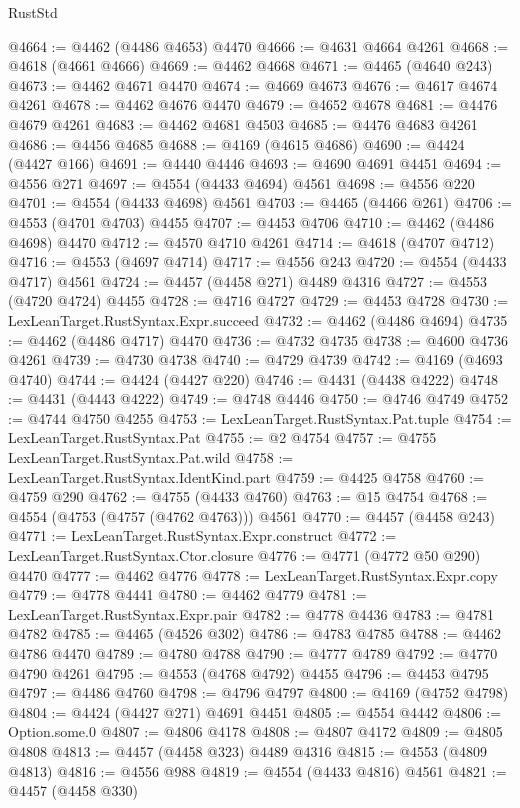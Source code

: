 \begin{lexlean}{RustStd}
\begin{coremodule}
@4664 := @4462 (@4486 @4653) @4470
@4666 := @4631 @4664 @4261
@4668 := @4618 (@4661 @4666)
@4669 := @4462 @4668
@4671 := @4465 (@4640 @243)
@4673 := @4462 @4671 @4470
@4674 := @4669 @4673
@4676 := @4617 @4674 @4261
@4678 := @4462 @4676 @4470
@4679 := @4652 @4678
@4681 := @4476 @4679 @4261
@4683 := @4462 @4681 @4503
@4685 := @4476 @4683 @4261
@4686 := @4456 @4685
@4688 := @4169 (@4615 @4686)
@4690 := @4424 (@4427 @166)
@4691 := @4440 @4446
@4693 := @4690 @4691 @4451
@4694 := @4556 @271
@4697 := @4554 (@4433 @4694) @4561
@4698 := @4556 @220
@4701 := @4554 (@4433 @4698) @4561
@4703 := @4465 (@4466 @261)
@4706 := @4553 (@4701 @4703) @4455
@4707 := @4453 @4706
@4710 := @4462 (@4486 @4698) @4470
@4712 := @4570 @4710 @4261
@4714 := @4618 (@4707 @4712)
@4716 := @4553 (@4697 @4714)
@4717 := @4556 @243
@4720 := @4554 (@4433 @4717) @4561
@4724 := @4457 (@4458 @271) @4489 @4316
@4727 := @4553 (@4720 @4724) @4455
@4728 := @4716 @4727
@4729 := @4453 @4728
@4730 := LexLeanTarget.RustSyntax.Expr.succeed
@4732 := @4462 (@4486 @4694)
@4735 := @4462 (@4486 @4717) @4470
@4736 := @4732 @4735
@4738 := @4600 @4736 @4261
@4739 := @4730 @4738
@4740 := @4729 @4739
@4742 := @4169 (@4693 @4740)
@4744 := @4424 (@4427 @220)
@4746 := @4431 (@4438 @4222)
@4748 := @4431 (@4443 @4222)
@4749 := @4748 @4446
@4750 := @4746 @4749
@4752 := @4744 @4750 @4255
@4753 := LexLeanTarget.RustSyntax.Pat.tuple
@4754 := LexLeanTarget.RustSyntax.Pat
@4755 := @2 @4754
@4757 := @4755 LexLeanTarget.RustSyntax.Pat.wild
@4758 := LexLeanTarget.RustSyntax.IdentKind.part
@4759 := @4425 @4758
@4760 := @4759 @290
@4762 := @4755 (@4433 @4760)
@4763 := @15 @4754
@4768 := @4554 (@4753 (@4757 (@4762 @4763))) @4561
@4770 := @4457 (@4458 @243)
@4771 := LexLeanTarget.RustSyntax.Expr.construct
@4772 := LexLeanTarget.RustSyntax.Ctor.closure
@4776 := @4771 (@4772 @50 @290) @4470
@4777 := @4462 @4776
@4778 := LexLeanTarget.RustSyntax.Expr.copy
@4779 := @4778 @4441
@4780 := @4462 @4779
@4781 := LexLeanTarget.RustSyntax.Expr.pair
@4782 := @4778 @4436
@4783 := @4781 @4782
@4785 := @4465 (@4526 @302)
@4786 := @4783 @4785
@4788 := @4462 @4786 @4470
@4789 := @4780 @4788
@4790 := @4777 @4789
@4792 := @4770 @4790 @4261
@4795 := @4553 (@4768 @4792) @4455
@4796 := @4453 @4795
@4797 := @4486 @4760
@4798 := @4796 @4797
@4800 := @4169 (@4752 @4798)
@4804 := @4424 (@4427 @271) @4691 @4451
@4805 := @4554 @4442
@4806 := Option.some.{0}
@4807 := @4806 @4178
@4808 := @4807 @4172
@4809 := @4805 @4808
@4813 := @4457 (@4458 @323) @4489 @4316
@4815 := @4553 (@4809 @4813)
@4816 := @4556 @988
@4819 := @4554 (@4433 @4816) @4561
@4821 := @4457 (@4458 @330)

\end{coremodule}
\end{lexlean}
